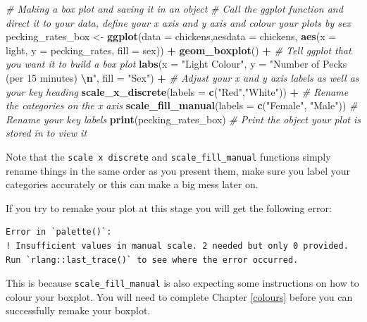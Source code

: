 \documentclass[
]{book}
\newenvironment{Shaded}{\begin{snugshade}}{\end{snugshade}}
\newcommand{\AttributeTok}[1]{\textcolor[rgb]{0.13,0.29,0.53}{#1}}
\newcommand{\CommentTok}[1]{\textcolor[rgb]{0.56,0.35,0.01}{\textit{#1}}}
\newcommand{\FunctionTok}[1]{\textcolor[rgb]{0.13,0.29,0.53}{\textbf{#1}}}
\newcommand{\NormalTok}[1]{#1}
\newcommand{\OtherTok}[1]{\textcolor[rgb]{0.56,0.35,0.01}{#1}}
\newcommand{\SpecialCharTok}[1]{\textcolor[rgb]{0.81,0.36,0.00}{\textbf{#1}}}
\newcommand{\StringTok}[1]{\textcolor[rgb]{0.31,0.60,0.02}{#1}}
\begin{document}
\begin{Shaded}
\begin{Highlighting}[]
\CommentTok{\# Making a box plot and saving it in an object}
\CommentTok{\# Call the ggplot function and direct it to your data, define your x axis and y axis and colour your plots by sex}
\NormalTok{pecking\_rates\_box }\OtherTok{\textless{}{-}} \FunctionTok{ggplot}\NormalTok{(}\AttributeTok{data =}\NormalTok{ chickens,}\AttributeTok{aesdata =}\NormalTok{ chickens, }\FunctionTok{aes}\NormalTok{(}\AttributeTok{x =}\NormalTok{ light, }\AttributeTok{y =}\NormalTok{ pecking\_rates, }\AttributeTok{fill =}\NormalTok{ sex)) }\SpecialCharTok{+}
  \FunctionTok{geom\_boxplot}\NormalTok{() }\SpecialCharTok{+} \CommentTok{\# Tell ggplot that you want it to build a box plot}
  \FunctionTok{labs}\NormalTok{(}\AttributeTok{x =} \StringTok{"Light Colour"}\NormalTok{, }\AttributeTok{y =} \StringTok{"Number of Pecks (per 15 minutes) }\SpecialCharTok{\textbackslash{}n}\StringTok{"}\NormalTok{, }\AttributeTok{fill =} \StringTok{"Sex"}\NormalTok{) }\SpecialCharTok{+} \CommentTok{\# Adjust your x and y axis labels as well as your key heading}
  \FunctionTok{scale\_x\_discrete}\NormalTok{(}\AttributeTok{labels =} \FunctionTok{c}\NormalTok{(}\StringTok{"Red"}\NormalTok{,}\StringTok{"White"}\NormalTok{)) }\SpecialCharTok{+} \CommentTok{\# Rename the categories on the x axis }
  \FunctionTok{scale\_fill\_manual}\NormalTok{(}\AttributeTok{labels =} \FunctionTok{c}\NormalTok{(}\StringTok{"Female"}\NormalTok{, }\StringTok{"Male"}\NormalTok{)) }\CommentTok{\# Rename your key labels}
\FunctionTok{print}\NormalTok{(pecking\_rates\_box) }\CommentTok{\# Print the object your plot is stored in to view it}
\end{Highlighting}
\end{Shaded}

Note that the \texttt{scale\ x\ discrete} and \texttt{scale\_fill\_manual} functions simply rename things in the same order as you present them, make sure you label your categories accurately or this can make a big mess later on.

If you try to remake your plot at this stage you will get the following error:

\begin{verbatim}
Error in `palette()`:
! Insufficient values in manual scale. 2 needed but only 0 provided.
Run `rlang::last_trace()` to see where the error occurred.
\end{verbatim}

This is because \texttt{scale\_fill\_manual} is also expecting some instructions on how to colour your boxplot. You will need to complete Chapter \ref{colours} before you can successfully remake your boxplot.
\end{document}
